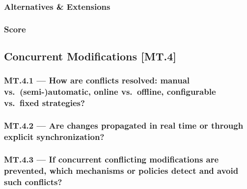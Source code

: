\documentclass[sigconf]{acmart}
\begin{document}


\subsubsection*{Alternatives \& Extensions}
\label{sec:MT3-Alternatives-Extensions}


\subsubsection*{Score}
\label{sec:MT3-Score}



\subsection{Concurrent Modifications [MT.4]}
\label{sec:MT4}

\subsubsection*{MT.4.1 --- How are conflicts resolved: manual vs.\ (semi-)automatic, online vs.\ offline, configurable vs.\ fixed strategies?}
\label{sec:MT4-1}



\subsubsection*{MT.4.2 --- Are changes propagated in real time or through explicit synchronization?}
\label{sec:MT4-2}



\subsubsection*{MT.4.3 --- If concurrent conflicting modifications are prevented, which mechanisms or policies detect and avoid such conflicts?}
\label{sec:MT4-3}

\end{document}
